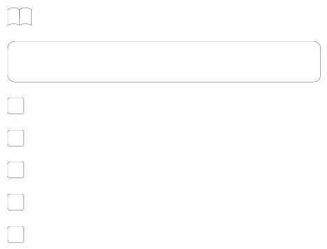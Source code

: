 \documentclass[11pt,titlepage]{article}
\begin{document}
\vspace{12mm}

\noindent
\includegraphics[]{book.pdf}

\pagebreak

\small %
\hfill

\vspace{6mm}

\noindent
\includegraphics[]{mediumbox.pdf}

\vspace{15mm}

\noindent
\includegraphics[]{checkbox-4mm.pdf}

\vspace{10mm}

\noindent
\includegraphics[]{checkbox-4mm.pdf}

\vspace{10mm}

\noindent
\includegraphics[]{checkbox-4mm.pdf}

\vspace{10mm}

\noindent
\includegraphics[]{checkbox-4mm.pdf}

\vspace{10mm}

\noindent
\includegraphics[]{checkbox-4mm.pdf}

\vspace{10mm}
\end{document}
